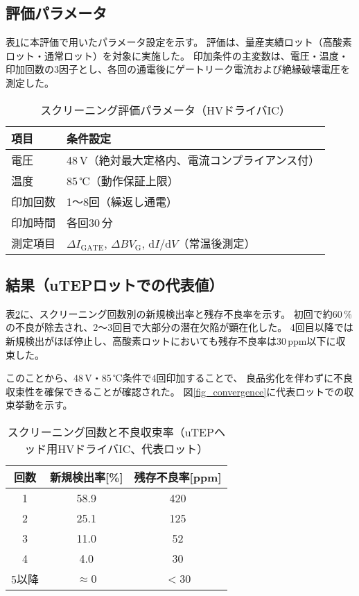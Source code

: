 \documentclass[twocolumn]{ieeetran}
\begin{document}
\subsection{評価パラメータ}
表\ref{tab_param}に本評価で用いたパラメータ設定を示す。
評価は、量産実績ロット（高酸素ロット・通常ロット）を対象に実施した。
印加条件の主変数は、電圧・温度・印加回数の3因子とし、各回の通電後にゲートリーク電流および絶縁破壊電圧を測定した。

\begin{table}[t]
\centering
\caption{スクリーニング評価パラメータ（HVドライバIC）}
\label{tab_param}
\begin{tabular}{ll}
\toprule
項目 & 条件設定 \\
\midrule
電圧 & 48\,V（絶対最大定格内、電流コンプライアンス付） \\
温度 & 85\,℃（動作保証上限） \\
印加回数 & 1～8回（繰返し通電） \\
印加時間 & 各回30\,分 \\
測定項目 & $\Delta I_\mathrm{GATE}$, $\Delta BV_\mathrm{G}$, d$I$/d$V$（常温後測定） \\
\bottomrule
\end{tabular}
\end{table}

\subsection{結果（uTEPロットでの代表値）}
表\ref{tab_results}に、スクリーニング回数別の新規検出率と残存不良率を示す。
初回で約60\,\%の不良が除去され、2～3回目で大部分の潜在欠陥が顕在化した。
4回目以降では新規検出がほぼ停止し、高酸素ロットにおいても残存不良率は30\,ppm以下に収束した。

このことから、48\,V・85\,℃条件で4回印加することで、
良品劣化を伴わずに不良収束性を確保できることが確認された。
図\ref{fig_convergence}に代表ロットでの収束挙動を示す。

\begin{table}[t]
\centering
\caption{スクリーニング回数と不良収束率（uTEPヘッド用HVドライバIC、代表ロット）}
\label{tab_results}
\begin{tabular}{ccc}
\toprule
回数 & 新規検出率[\%] & 残存不良率[ppm] \\
\midrule
1 & 58.9 & 420 \\
2 & 25.1 & 125 \\
3 & 11.0 & 52 \\
4 & 4.0  & 30 \\
5以降 & $\approx$0 & $<$30 \\
\bottomrule
\end{tabular}
\end{table}
\end{document}
